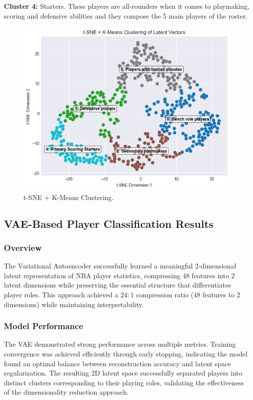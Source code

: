 \documentclass{article}
\begin{document}
{\bf Cluster 4:} Starters. These players are all-rounders when it comes to playmaking, scoring and defensive abilities and they compose the 5 main players of the roster.

\begin{figure}[h]
    \centering
    \includegraphics[width=0.7\linewidth]{media/2c.png}
    \caption{t-SNE + K-Means Clustering.}
\end{figure}

\subsection{VAE-Based Player Classification Results}

\subsubsection{Overview}

The Variational Autoencoder successfully learned a meaningful 2-dimensional latent representation of NBA player statistics, compressing 48 features into 2 latent dimensions while preserving the essential structure that differentiates player roles. This approach achieved a $24:1$ compression ratio (48 features to 2 dimensions) while maintaining interpretability.

\subsubsection{Model Performance}

The VAE demonstrated strong performance across multiple metrics. Training convergence was achieved efficiently through early stopping, indicating the model found an optimal balance between reconstruction accuracy and latent space regularization. The resulting 2D latent space successfully separated players into distinct clusters corresponding to their playing roles, validating the effectiveness of the dimensionality reduction approach.
\end{document}
